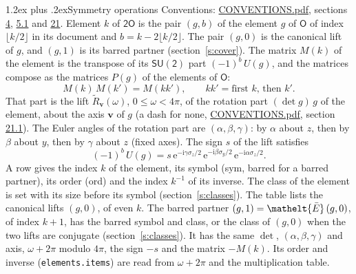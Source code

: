 \documentclass[10pt,a4paper]{article}
\makeatletter
\renewcommand\section{\@startsection{section}{1}{\z@}{-3ex plus -1ex minus -.2ex}%
  {1.2ex plus .2ex}{\normalfont\large\sffamily\bfseries\color{parttitle}}}
\numberwithin{equation}{section}
\newcommand{\eltfont}[1]{{\let\sigma\eltsigma\mathelt{#1}}}
\newcommand{\grp}[1]{\mathsf{#1}}
\newcommand{\elt}[1]{\eltfont{#1}}
\newcommand{\vv}{\mathbf{v}}
\newcommand{\iunit}{\mathrm{i}}
\newcommand{\expe}{\mathrm{e}}
\newcommand{\barred}[1]{\bar{#1}}
\newcommand{\lift}[1]{\tilde{#1}}
\newcommand{\pauli}[1]{\sigma_{#1}}
\makeatother
\begin{document}
\section{Symmetry operations}\label{s:elements}
Conventions: \href{../../CONVENTIONS.pdf}{CONVENTIONS.pdf}, sections \href{../../../rotation/CONVENTIONS.pdf\#conv.4}{4}, \href{../../../rotation/CONVENTIONS.pdf\#conv.5.1}{5.1} and \href{../../CONVENTIONS.pdf\#conv.21}{21}.
\leavevmode\label{n:index.element}\label{n:element.g}Element $k$ of $\grp{2O}$ is the pair $(g, b)$ of the element $g$ of \href{../../../rotation/data/pdf/O.pdf}{$\grp{O}$} of index $\lfloor k/2\rfloor$ in its document and $b = k - 2\lfloor k/2\rfloor$. The pair $(g, 0)$ is the canonical lift of $g$, and $(g, 1)$ is its barred partner (section~\ref{s:cover}). \label{n:matrix.element.pin}\label{n:matrix.element}The matrix $M(k)$ of the element is the transpose of its $\grp{SU(2)}$ part $(-1)^{b}\,U(g)$, and the matrices compose as the matrices $P(g)$ of the elements of $\grp{O}$:
\begin{equation}\label{e:mprod}M(k)\,M(k') = M(kk'),\qquad kk' = \text{first } k\text{, then } k'.\end{equation}
\leavevmode\label{n:angle.omega}\label{n:vector.axis}\label{n:vector.pole}That part is the lift $\lift{R}_{\vv}(\omega)$, $0 \le \omega < 4\pi$, of the rotation part $(\det g)\,g$ of the element, about the axis $\vv$ of $g$ (a dash for none, \href{../../CONVENTIONS.pdf}{CONVENTIONS.pdf}, section \href{../../CONVENTIONS.pdf\#conv.21.1}{21.1}). \label{n:angle.euler.alpha}\label{n:angle.euler.beta}\label{n:angle.euler.gamma}\label{n:vector.coordinates}The Euler angles of the rotation part are $(\alpha,\beta,\gamma)$: by $\alpha$ about $z$, then by $\beta$ about $y$, then by $\gamma$ about $z$ (fixed axes). \label{n:local.euler.sign}The sign $s$ of the lift satisfies
\begin{equation}\label{e:euler}(-1)^{b}\,U(g) = s\,\expe^{-\iunit\gamma\pauli{z}/2}\,\expe^{-\iunit\beta\pauli{y}/2}\,\expe^{-\iunit\alpha\pauli{z}/2}.\end{equation}
\leavevmode\label{n:index.element.inverse}\label{n:head.sym}\label{n:head.ord}A row gives the index $k$ of the element, its symbol (sym, barred for a barred partner), its order (ord) and the index $k^{-1}$ of its inverse. \label{n:head.class}The class of the element is set with its size before its symbol (section~\ref{s:classes}).
The table lists the canonical lifts $(g, 0)$, of even $k$. The barred partner $(g, 1) = \elt{\barred{E}}\,(g, 0)$, of index $k + 1$, has the barred symbol and class, or the class of $(g, 0)$ when the two lifts are conjugate (section~\ref{s:classes}). It has the same $\det$, $(\alpha,\beta,\gamma)$ and axis, $\omega + 2\pi$ modulo $4\pi$, the sign $-s$ and the matrix $-M(k)$. Its order and inverse (\texttt{elements.items}) are read from $\omega + 2\pi$ and the multiplication table.
\end{document}
